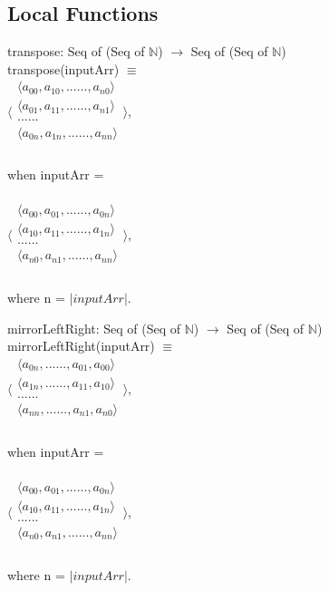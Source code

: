 \documentclass[12pt]{article}
\begin{document}
\subsection*{Local Functions}
\noindent transpose: Seq of (Seq of $ \mathbb{N}$) $\rightarrow$ Seq of (Seq of $\mathbb{N}$)\\
\noindent transpose(inputArr) $\equiv$\\
$\langle \begin{array}{c}
      \langle a_{00}, a_{10}, ... ... , a_{n0} \rangle\\
      \langle a_{01}, a_{11}, ... ... , a_{n1} \rangle\\
      ... ...\\
	 \langle a_{0n}, a_{1n}, ... ... , a_{nn} \rangle\\
      \end{array} \rangle$,\\\\
when inputArr = \\\\
$\langle \begin{array}{c}
      \langle a_{00}, a_{01}, ... ... , a_{0n} \rangle\\
      \langle a_{10}, a_{11}, ... ... , a_{1n} \rangle\\
      ... ...\\
	 \langle a_{n0}, a_{n1}, ... ... , a_{nn} \rangle\\
      \end{array} \rangle$,\\\\
where n = $|inputArr|$.\\

\medskip

\noindent mirrorLeftRight: Seq of (Seq of $ \mathbb{N}$) $\rightarrow$ Seq of (Seq of $\mathbb{N}$)\\
\noindent mirrorLeftRight(inputArr) $\equiv$\\
$\langle \begin{array}{c}
      \langle a_{0n},  ... ... , a_{01}, a_{00} \rangle\\
      \langle a_{1n},  ... ... , a_{11}, a_{10} \rangle\\
      ... ...\\
	 \langle a_{nn},  ... ... , a_{n1}, a_{n0} \rangle\\
      \end{array} \rangle$,\\\\
when inputArr = \\\\
$\langle \begin{array}{c}
      \langle a_{00}, a_{01}, ... ... , a_{0n} \rangle\\
      \langle a_{10}, a_{11}, ... ... , a_{1n} \rangle\\
      ... ...\\
	 \langle a_{n0}, a_{n1}, ... ... , a_{nn} \rangle\\
      \end{array} \rangle$,\\\\
where n = $|inputArr|$.\\
\end{document}
